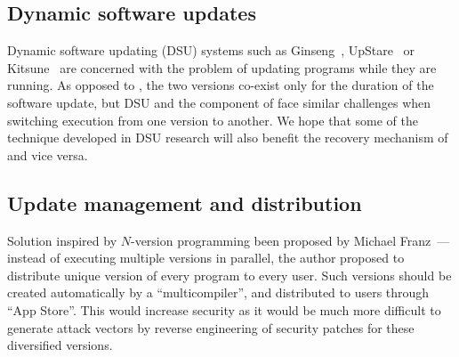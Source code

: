 \subsection{Dynamic software updates}

Dynamic software updating (DSU) systems such as Ginseng~\cite{ginseng},
UpStare~\cite{upstare} or Kitsune~\cite{kitsune} are concerned with the problem
of updating programs while they are running.  As opposed to \mx, the two
versions co-exist only for the duration of the software update, but DSU and the
\rem component of \mx face similar challenges when switching execution from one
version to another.  We hope that some of the technique developed in DSU
research will also benefit the recovery mechanism of \mx and vice versa.

\subsection{Update management and distribution}

Solution inspired by $N$-version programming been proposed by Michael
Franz~\cite{unibus:nspw10}---instead of executing multiple versions in parallel,
the author proposed to distribute unique version of every program to every
user. Such versions should be created automatically by a ``multicompiler'',
and distributed to users through ``App Store''. This would increase security as
it would be much more difficult to generate attack vectors by reverse
engineering of security patches for these diversified versions.



